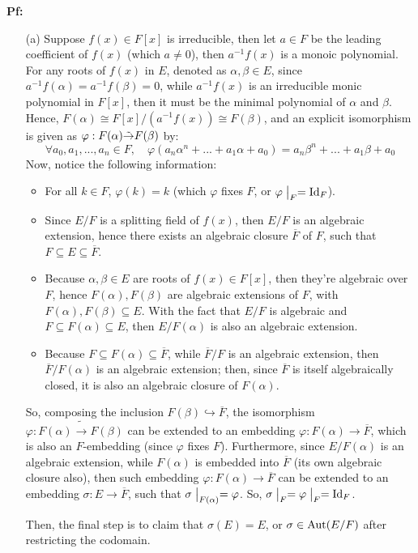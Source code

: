 \documentclass{article}
\begin{document}
\textbf{Pf:}
\begin{itemize}
    \item[(a)] Suppose $f(x)\in F[x]$ is irreducible, then let $a\in F$ be the leading coefficient of $f(x)$ (which $a\neq 0$), then $a^{-1}f(x)$ is a monoic polynomial. For any roots of $f(x)$ in $E$, denoted as $\alpha,\beta\in E$, since $a^{-1}f(\alpha)=a^{-1}f(\beta)=0$, while $a^{-1}f(x)$ is an irreducible monic polynomial in $F[x]$, then it must be the minimal polynomial of $\alpha$ and $\beta$. Hence, $F(\alpha)\cong F[x]/(a^{-1}f(x))\cong F(\beta)$, and an explicit isomorphism is given as $\varphi:F(\alpha)\Tilde{\rightarrow }F(\beta)$ by:
    $$\forall a_0,a_1,...,a_n\in F,\quad \varphi(a_n\alpha^n+...+a_1\alpha+a_0)=a_n\beta^n+...+a_1\beta+a_0$$
    Now, notice the following information:
    \begin{itemize}
        \item For all $k\in F$, $\varphi(k)=k$ (which $\varphi$ fixes $F$, or $\varphi\bigm|_{F}=\textmd{Id}_F$).
        \item Since $E/F$ is a splitting field of $f(x)$, then $E/F$ is an algebraic extension, hence there exists an algebraic closure $\overline{F}$ of $F$, such that $F\subseteq E\subseteq \overline{F}$.
        \item Because $\alpha,\beta\in E$ are roots of $f(x)\in F[x]$, then they're algebraic over $F$, hence $F(\alpha),F(\beta)$ are algebraic extensions of $F$, with $F(\alpha),F(\beta)\subseteq E$. With the fact that $E/F$ is algebraic and $F\subseteq F(\alpha)\subseteq E$, then $E/F(\alpha)$ is also an algebraic extension.
        \item Because $F\subseteq F(\alpha)\subseteq \overline{F}$, while $\overline{F}/F$ is an algebraic extension, then $\overline{F}/F(\alpha)$ is an algebraic extension; then, since $\overline{F}$ is itself algebraically closed, it is also an algebraic closure of $F(\alpha)$.
    \end{itemize}
    So, composing the inclusion $F(\beta)\hookrightarrow \overline{F}$, the isomorphism $\varphi:F(\alpha)\tilde{\rightarrow}F(\beta)$ can be extended to an embedding $\varphi:F(\alpha)\rightarrow \overline{F}$, which is also an $F$-embedding (since $\varphi$ fixes $F$). Furthermore, since $E/F(\alpha)$ is an algebraic extension, while $F(\alpha)$ is embedded into $\overline{F}$ (its own algebraic closure also), then such embedding $\varphi:F(\alpha)\rightarrow\overline{F}$ can be extended to an embedding $\sigma:E\rightarrow \overline{F}$, such that $\sigma\bigm|_{F(\alpha)} = \varphi$. So, $\sigma\bigm|_{F} = \varphi\bigm|_{F} = \textmd{Id}_F$.

    Then, the final step is to claim that $\sigma(E)=E$, or $\sigma\in \textmd{Aut}(E/F)$ after restricting the codomain.


\end{itemize}
\end{document}
